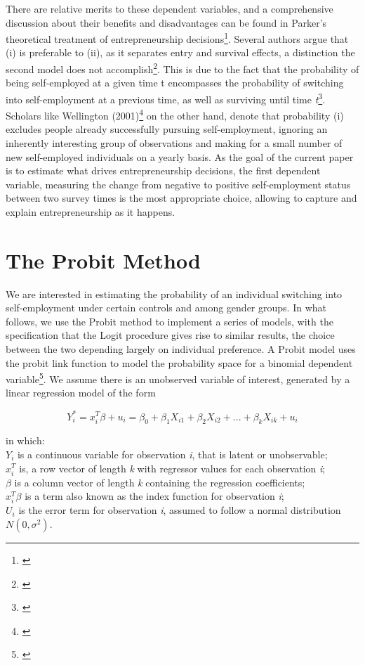 There are relative merits to these dependent variables, and a comprehensive discussion about their benefits and disadvantages can be found in Parker's theoretical treatment of entrepreneurship decisions\footnote{\cite[Page~26]{Parker2004}}. Several authors argue that (i) is preferable to (ii), as it separates entry and survival effects, a distinction the second model does not accomplish\footnote{\cite{EvansLeighton1989}}. This is due to the fact that the probability of being self-employed at a given time t encompasses the probability of switching into self-employment at a previous time, as well as surviving until time \textit{t}\footnote{\cite{EvansLeighton1989}}. Scholars like Wellington (2001)\footnote{\cite{Wellington2001}} on the other hand, denote that probability (i) excludes people already successfully pursuing self-employment, ignoring an inherently interesting group of observations and making for a small number of new self-employed individuals on a yearly basis. As the goal of the current paper is to estimate what drives entrepreneurship decisions, the first dependent variable, measuring the change from negative to positive self-employment status between two survey times is the most appropriate choice, allowing to capture and explain entrepreneurship as it happens. 


\section{The Probit Method}

We are interested in estimating the probability of an individual switching into self-employment under certain controls and among gender groups. In what follows, we use the Probit method to implement a series of models, with the specification that the Logit  procedure gives rise to similar results, the choice between the two depending largely on individual preference. A Probit model uses the probit link function to model the probability space for a binomial dependent variable\footnote{\cite{AldrichNelson1984}}. We assume there is an unobserved variable of interest, generated by a linear regression model of the form


\begin{dmath}
\mbox{$Y^{*}_{i} = x^{T}_i\beta + u_i = \beta_0 + \beta_1X_{i1} + \beta_2X_{i2} + ... + \beta_kX_{ik} + u_i$}
\end{dmath}

in which: \\

$Y_i$ is a continuous variable for observation \textit{i}, that is latent or unobservable; \\
$x^T_i$ is, a row vector of length \textit{k} with regressor values for each observation \textit{i}; \\ 
$\beta$ is a column vector of length \textit{k} containing the regression coefficients; \\
$x^T_i\beta$ is a term also known as the index function for observation \textit{i}; \\
$U_i$ is the error term for observation \textit{i}, assumed to follow a normal distribution $N(0, \sigma^2)$. \\

